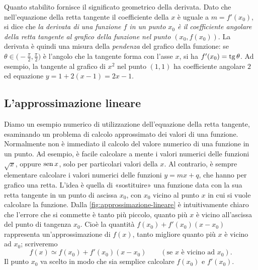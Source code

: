Quanto stabilito fornisce il significato geometrico della derivata. Dato che
nell'equazione della retta tangente il coefficiente della $x$ è uguale a $m=f'(x_{0})$, si
dice che \emph{la derivata di una funzione $f$ in un punto $x_{0}$ è il coefficiente
angolare della retta tangente al grafico della funzione nel punto $(x_{0},f(x_{0}))$}. La
derivata è quindi una misura della \emph{pendenza} del grafico della funzione: se
$\theta\in\bigl(-\frac\pi2,\frac\pi2\bigr)$ è l'angolo che la tangente forma con l'asse $x$,
si ha $f'(x_{0})=\operatorname{tg}\theta$. Ad esempio, la tangente al grafico di $x^{2}$ nel punto $(1,1)$
ha coefficiente angolare $2$ ed equazione $y=1+2(x-1)=2x-1$.

\subsection{L'approssimazione lineare}

Diamo un esempio numerico di utilizzazione dell'equazione della retta tangente,
esaminando un problema di calcolo approssimato dei valori di una funzione. Normalmente non
è immediato il calcolo del valore numerico di una funzione in un punto. Ad esempio, è
facile calcolare a mente i valori numerici delle funzioni $\sqrt x$, oppure $\operatorname{sen} x$,
solo per particolari valori della $x$. Al contrario, è sempre elementare calcolare i
valori numerici delle funzioni $y=mx+q$, che hanno per grafico una retta. L'idea è quella
di «sostituire» una funzione data con la sua retta tangente in un punto di ascissa
$x_{0}$, con $x_{0}$ vicino al punto $x$ in cui si vuole calcolare la funzione. Dalla
\cref{fig:approssimazione-lineare} è intuitivamente chiaro che l'errore che si commette è
tanto più piccolo, quanto più $x$ è vicino all'ascissa del punto di tangenza $x_{0}$.
Cioè la quantità $f(x_{0})+f'(x_{0})(x-x_{0})$ rappresenta un'approssimazione di $f(x)$,
tanto migliore quanto più $x$ è vicino ad $x_{0}$; scriveremo
\begin{equation}\label{eq:approssimazione-lineare}
  f(x)\simeq f(x_{0})+f'(x_{0})(x-x_{0}) \qquad(\text{se } x \text{ è vicino ad } x_{0}).
\end{equation}
Il punto $x_{0}$ va scelto in modo che sia semplice calcolare $f(x_{0})$ e $f'(x_{0})$.

